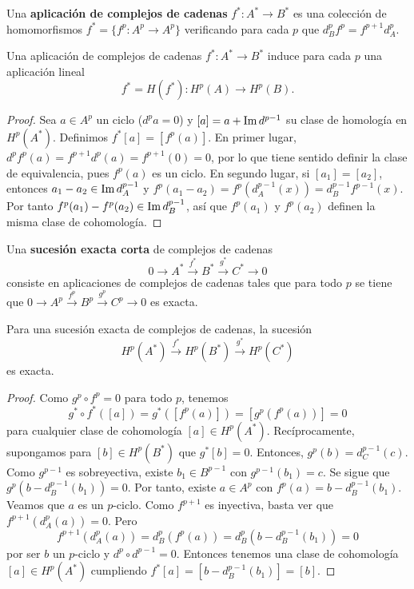 \documentclass[CV.tex]{subfiles}
\begin{document}
\begin{defi}
Una \textbf{aplicación de complejos de cadenas} $f^*:A^*\to B^*$ es una colección de homomorfismos $f^*=\{f^p:A^p\to A^p\}$ verificando para cada $p$ que $d_B^pf^p=f^{p+1}d_A^p$. 
\end{defi}

\begin{lemma}
Una aplicación de complejos de cadenas $f^*:A^*\to B^*$ induce para cada $p$ una aplicación lineal 
\[
f^*=H(f^*):H^p(A)\to H^p(B).
\]
\end{lemma}
\begin{proof}
Sea $a\in A^p$ un ciclo ($d^pa=0$) y $[a]=a+\operatorname{Im}{d^{p-1}}$ su clase de homología en $H^p(A^*)$. Definimos $f^*[a]=[f^p(a)]$. En primer lugar, $d^pf^p(a)=f^{p+1}d^p(a)=f^{p+1}(0)=0$, por lo que tiene sentido definir la clase de equivalencia, pues $f^p(a)$ es un ciclo. En segundo lugar, si $[a_1]=[a_2]$, entonces $a_1-a_2\in\operatorname{Im}{d_A^{p-1}}$ y $f^p(a_1-a_2)=f^p(d_A^{p-1}(x))=d_B^{p-1}f^{p-1}(x)$. Por tanto $f^p(a_1)-f^p(a_2)\in\operatorname{Im}{d_B^{p-1}}$, así que $f^p(a_1)$ y $f^p(a_2)$ definen la misma clase de cohomología.
\end{proof}

\begin{defi}
Una \textbf{sucesión exacta corta} de complejos de cadenas
\[
0\to A^*\overset{f^*}{\to}B^*\overset{g^*}{\to}C^*\to 0
\]
consiste en aplicaciones de complejos de cadenas tales que para todo $p$ se tiene que $0\to A^p\overset{f^p}{\to}B^p\overset{g^p}{\to}C^p\to 0$ es exacta.
\end{defi}

\begin{lemma}\label{lema1}
Para una sucesión exacta de complejos de cadenas, la sucesión
\[
H^p(A^*)\overset{f^*}{\to}H^p(B^*)\overset{g^*}{\to}H^p(C^*)
\]
es exacta.
\end{lemma}
\begin{proof}
Como $g^p\circ f^p=0$ para todo $p$, tenemos
\[
g^*\circ f^*([a])=g^*([f^p(a)])=[g^p(f^p(a))]=0
\]
para cualquier clase de cohomología $[a]\in H^p(A^*)$. Recíprocamente, supongamos para $[b]\in H^p(B^*)$ que $g^*[b]=0$. Entonces, $g^p(b)=d_C^{p-1}(c)$. Como $g^{p-1}$ es sobreyectiva, existe $b_1\in B^{p-1}$ con $g^{p-1}(b_1)=c$. Se sigue que $g^p(b-d_B^{p-1}(b_1))=0$. Por tanto, existe $a\in A^p$ con $f^p(a)=b-d_B^{p-1}(b_1)$. Veamos que $a$ es un $p$-ciclo. Como $f^{p+1}$ es inyectiva, basta ver que $f^{p+1}(d_A^p(a))=0$. Pero
\[
f^{p+1}(d_A^p(a))=d_B^p(f^p(a))=d_B^p(b-d_B^{p-1}(b_1))=0
\]
por ser $b$ un $p$-ciclo y $d^p\circ d^{p-1}=0$. Entonces tenemos una clase de cohomología $[a]\in H^p(A^*)$ cumpliendo $f^*[a]=[b-d_B^{p-1}(b_1)]=[b]$.

\end{proof}
\end{document}
